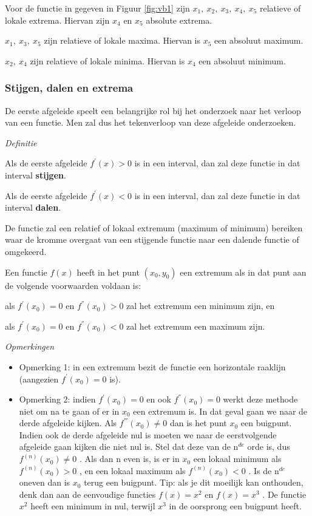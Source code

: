 Voor de functie in gegeven in Figuur \ref{fig:vb1} zijn \noindent $x_{1},\:x_{2},\:x_{3},\:x_{4},\:x_{5}$ relatieve
of lokale extrema. Hiervan zijn $x_{4}$ en $x_{5}$ absolute extrema.

\noindent $x_{1},\:x_{3},\:x_{5}$ zijn relatieve of lokale maxima.
Hiervan is $x_{5}$ een absoluut maximum.

\noindent $x_{2},\:x_{4}$ zijn relatieve of lokale minima. Hiervan
is $x_{4}$ een absoluut minimum.


\subsubsection{Stijgen, dalen en extrema}

\noindent De eerste afgeleide speelt een belangrijke rol bij het onderzoek
naar het verloop van een functie. Men zal dus het tekenverloop van
deze afgeleide onderzoeken.

\medskip{}
\emph{Definitie}

\noindent Als de eerste afgeleide $f^{'}(x)>0$ is in een interval,
dan zal deze functie in dat interval \textbf{stijgen}.

\noindent Als de eerste afgeleide $f^{'}(x)<0$ is in een interval,
dan zal deze functie in dat interval \textbf{dalen}.

\noindent De functie zal een relatief of lokaal extremum (maximum
of minimum) bereiken waar de kromme overgaat van een stijgende functie
naar een dalende functie of omgekeerd.

\noindent Een functie $f(x)$ heeft in het punt $(x_{0},y_{0})$ een
extremum als in dat punt aan de volgende voorwaarden voldaan is:

\textbullet{} als $f^{'}(x_{0})=0$ en $f^{''}(x_{0})>0$ zal het
extremum een minimum zijn, en

\textbullet{} als $f^{'}(x_{0})=0$ en $f^{''}(x_{0})<0$ zal het
extremum een maximum zijn.

\bigskip{}

\emph{Opmerkingen}
\begin{itemize}
\item Opmerking 1: in een extremum bezit de functie een horizontale
raaklijn (aangezien $f^{'}(x_{0})=0$ is).
\item Opmerking 2: indien $f^{'}(x_{0})=0$ en ook $f^{''}(x_{0})=0$
werkt deze methode niet om na te gaan of er in $x_{0}$ een extremum
is. In dat geval gaan we naar de derde afgeleide kijken. Als $f^{'''}(x_{0})\neq0$
dan is het punt $x_{0}$ een buigpunt. Indien ook de derde afgeleide
nul is moeten we naar de eerstvolgende afgeleide gaan kijken die niet
nul is. Stel dat deze van de n$^{de}$ orde is, dus $f^{(n)}(x_{0})\neq0$
. Als dan n even is, is er in $x_{0}$ een lokaal minimum als $f^{(n)}(x_{0})>0$
, en een lokaal maximum als $f^{(n)}(x_{0})<0$ . Is de n$^{de}$
oneven dan is $x_{0}$ terug een buigpunt. Tip: als je dit moeilijk
kan onthouden, denk dan aan de eenvoudige functies $f(x)=x^{2}$ en
$f(x)=x^{3}$ . De functie $x^{2}$ heeft een minimum in nul, terwijl
$x^{3}$ in de oorsprong een buigpunt heeft.
\end{itemize}


